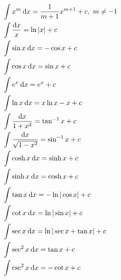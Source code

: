 \begin{align*}
&\int x^m\:\textup{d} x = \frac{1}{m+1}x^{m+1}+c,\ m\ne -1\\
&\int \frac{\textup{d} x}{x} = \ln |x|+c\\
&\int \sin x\:\textup{d} x = -\cos x+c\\
&\int \cos x\:\textup{d} x = \sin x+c\\
&\int e^x\:\textup{d} x = e^x +c\\
&\int \ln x \:\textup{d} x = x \ln x - x+c\\
&\int \frac{\textup{d} x}{1+x^2}  = \tan^{-1} x+c\\
&\int \frac{\textup{d} x}{\sqrt{1-x^2}}  = \sin^{-1} x+c\\
&\int \cosh x \:\textup{d} x = \sinh x+c\\
&\int \sinh x \:\textup{d} x = \cosh x+c\\
&\int \tan x\:\textup{d} x = -\ln|\cos x|+c\\
&\int \cot x\:\textup{d} x = \ln|\sin x|+c\\
&\int \sec x\:\textup{d} x = \ln|\sec x +\tan x| +c\\
&\int \sec ^2 x\:\textup{d} x = \tan x +c\\
&\int \csc ^2 x\:\textup{d} x = -\cot x +c
\end{align*}
